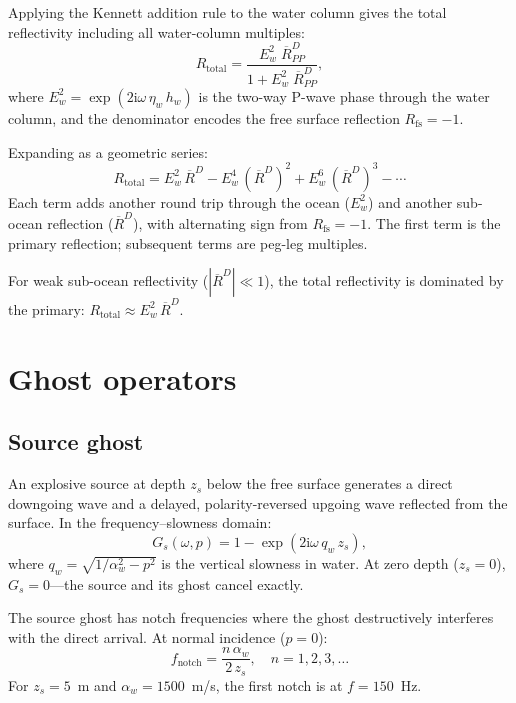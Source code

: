 \documentclass[11pt,a4paper]{article}
\newcommand{\ii}{\mathrm{i}}
\begin{document}
Applying the Kennett addition rule to the water column gives the
total reflectivity including all water-column multiples:
\begin{equation}\label{eq:reverb}
  \boxed{R_{\text{total}}
  = \frac{E_w^2\;\overline{R}^D_{PP}}
         {1 + E_w^2\;\overline{R}^D_{PP}},}
\end{equation}
where $E_w^2 = \exp(2\ii\omega\,\eta_w\,h_w)$ is the two-way
P-wave phase through the water column, and the denominator
encodes the free surface reflection $R_{\text{fs}} = -1$.

Expanding as a geometric series:
\begin{equation}\label{eq:geom}
  R_{\text{total}} = E_w^2\,\overline{R}^D
    - E_w^4\,(\overline{R}^D)^2
    + E_w^6\,(\overline{R}^D)^3
    - \cdots
\end{equation}
Each term adds another round trip through the ocean ($E_w^2$)
and another sub-ocean reflection ($\overline{R}^D$), with
alternating sign from $R_{\text{fs}} = -1$.  The first term is
the primary reflection; subsequent terms are peg-leg multiples.

For weak sub-ocean reflectivity ($|\overline{R}^D| \ll 1$),
the total reflectivity is dominated by the primary:
$R_{\text{total}} \approx E_w^2\,\overline{R}^D$.

\section{Ghost operators}
\label{sec:ghosts}

\subsection{Source ghost}

An explosive source at depth $z_s$ below the free surface
generates a direct downgoing wave and a delayed, polarity-reversed
upgoing wave reflected from the surface.  In the frequency--slowness
domain:
\begin{equation}\label{eq:source_ghost}
  G_s(\omega, p) = 1 - \exp(2\ii\omega\,q_w\,z_s),
\end{equation}
where $q_w = \sqrt{1/\alpha_w^2 - p^2}$ is the vertical slowness
in water.  At zero depth ($z_s = 0$), $G_s = 0$---the source and
its ghost cancel exactly.

The source ghost has notch frequencies where the ghost destructively
interferes with the direct arrival.  At normal incidence ($p = 0$):
\begin{equation}
  f_{\text{notch}} = \frac{n\,\alpha_w}{2\,z_s}, \quad n = 1, 2, 3, \ldots
\end{equation}
For $z_s = 5$~m and $\alpha_w = 1500$~m/s, the first notch is at
$f = 150$~Hz.
\end{document}
